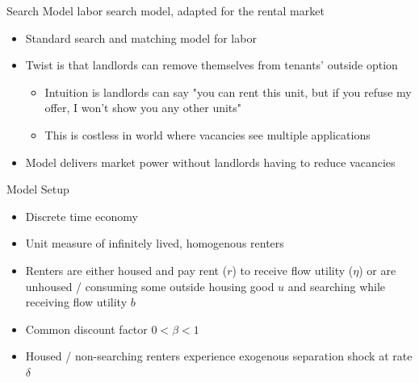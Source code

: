 \documentclass[10pt, xcolor=dvipsnames]{beamer}
\begin{document}
\begin{frame}{Search Model}
\cite{jarosh-search-2024} labor search model, adapted for the rental market 
    \begin{itemize}
        \item Standard search and matching model for labor
        \item Twist is that landlords can remove themselves from tenants' outside option
        \begin{itemize}
            \item Intuition is landlords can say "you can rent this unit, but if you refuse my offer, I won't show you any other units"
            \item This is costless in world where vacancies see multiple applications
        \end{itemize}
        \item Model delivers market power without landlords having to reduce vacancies
    \end{itemize}
\end{frame}

\begin{frame}{Model Setup}
    \begin{itemize}
    \item Discrete time economy
    \item Unit measure of infinitely lived, homogenous renters
    \item Renters are either housed and pay rent ($r$) to receive flow utility (\textbf{$\eta$}) or are unhoused / consuming some outside housing good \textbf{$u$} and searching while receiving flow utility \textbf{$b$}
    \item Common discount factor \textbf{$0 < \beta < 1$}
    \item Housed / non-searching renters experience exogenous separation shock at rate \textbf{$\delta$}
\end{itemize}
\end{frame}
\end{document}
